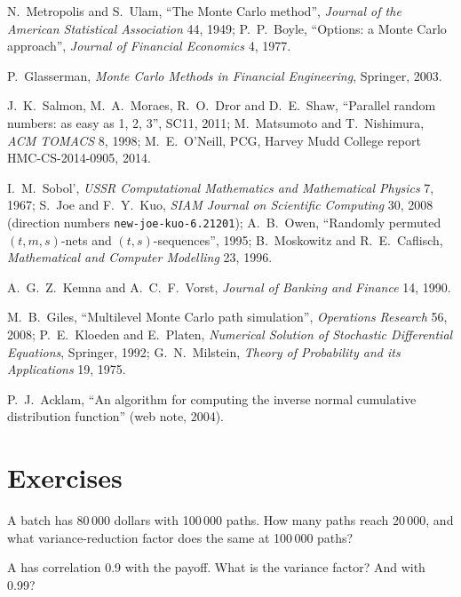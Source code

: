 \begin{omsources}
\item N.~Metropolis and S.~Ulam, ``The Monte Carlo method'', \emph{Journal of the American Statistical Association} 44, 1949; P.~P.~Boyle, ``Options: a Monte Carlo approach'', \emph{Journal of
Financial Economics} 4, 1977.
\item P.~Glasserman, \emph{Monte Carlo Methods in Financial Engineering}, Springer, 2003.
\item J.~K.~Salmon, M.~A.~Moraes, R.~O.~Dror and D.~E.~Shaw, ``Parallel random numbers: as easy as 1, 2, 3'', SC11, 2011; M.~Matsumoto and T.~Nishimura, \emph{ACM TOMACS} 8, 1998; M.~E.~O'Neill,
PCG, Harvey Mudd College report HMC-CS-2014-0905, 2014.
\item I.~M.~Sobol', \emph{USSR Computational Mathematics and Mathematical Physics} 7, 1967; S.~Joe and F.~Y.~Kuo, \emph{SIAM Journal on Scientific Computing} 30, 2008 (direction numbers
\texttt{new-joe-kuo-6.21201}); A.~B.~Owen, ``Randomly permuted $(t, m, s)$-nets and $(t, s)$-sequences'', 1995; B.~Moskowitz and R.~E.~Caflisch, \emph{Mathematical and Computer Modelling} 23, 1996.
\item A.~G.~Z.~Kemna and A.~C.~F.~Vorst, \emph{Journal of Banking and Finance} 14, 1990.
\item M.~B.~Giles, ``Multilevel Monte Carlo path simulation'', \emph{Operations Research} 56, 2008; P.~E.~Kloeden and E.~Platen, \emph{Numerical Solution of Stochastic Differential Equations},
Springer, 1992; G.~N.~Milstein, \emph{Theory of Probability and its Applications} 19, 1975.
\item P.~J.~Acklam, ``An algorithm for computing the inverse normal cumulative distribution function'' (web note, 2004).
\end{omsources}

\section{Exercises}

\begin{exercise}[$\star$]\label{exo:qm:monte-carlo:1}
A batch has  80\,000 dollars with 100\,000 paths. How many paths reach 20\,000, and what variance-reduction factor does the same at 100\,000 paths?
\end{exercise}

\begin{exercise}[$\star$]\label{exo:qm:monte-carlo:2}
A  has correlation 0.9 with the payoff. What is the variance factor? And with 0.99?
\end{exercise}

